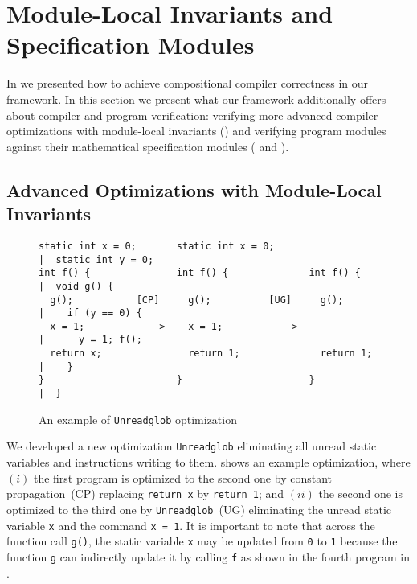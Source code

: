 \section{Module-Local Invariants and Specification Modules}
\label{sec:overview-modulelocal}

In  we presented how to achieve compositional compiler correctness
in our framework.  In this section we present what our framework additionally offers about compiler and
program verification: verifying more advanced compiler optimizations with module-local
invariants () and verifying program modules against their
mathematical specification modules ( and ).
%
%

\subsection{Advanced Optimizations with Module-Local Invariants}
\label{sec:overview-modulelocal:compiler}

\begin{figure}[t]
\begin{Verbatim}
static int x = 0;       static int x = 0;                   |  static int y = 0;
int f() {               int f() {              int f() {    |  void g() {
  g();           [CP]     g();          [UG]     g();       |    if (y == 0) {
  x = 1;        ----->    x = 1;       ----->               |      y = 1; f();
  return x;               return 1;              return 1;  |    }
}                       }                      }            |  }
\end{Verbatim}  
\caption{An example of \texttt{Unreadglob} optimization}
\label{fig:overview-modulelocal:compiler}
\end{figure}

We developed a new optimization \texttt{Unreadglob} eliminating all
unread static variables and instructions writing to them.
 shows an example
optimization, where $(i)$ the first program is optimized to the second
one by constant propagation~(CP) replacing \texttt{return x} by
\texttt{return 1}; and $(ii)$ the second one is optimized to the third
one by \texttt{Unreadglob}~(UG) eliminating the unread static variable
\texttt{x} and the command \texttt{x = 1}.  It is important to note
that across the function call \texttt{g()}, the static variable
\texttt{x} may be updated from \texttt{0} to \texttt{1} because the
function \texttt{g} can indirectly update it by calling \texttt{f} as shown in
the fourth program in .

